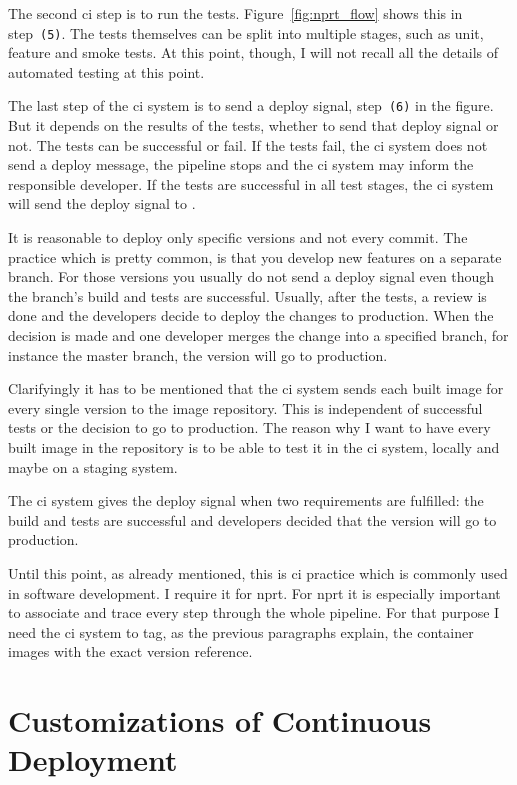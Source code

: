 The second \gls{ci} step is to run the tests. Figure~\ref{fig:nprt_flow} shows this in
step~\texttt{(5)}. The tests themselves can be split into multiple stages, such as unit,
feature and smoke tests. At this point, though, I will not recall all the details of
automated testing at this point.

The last step of the \gls{ci} system is to send a deploy signal, step~\texttt{(6)} in the
figure. But it depends on the results of the tests, whether to send that deploy signal or
not. The tests can be successful or fail. If the tests fail, the \gls{ci} system does not
send a deploy message, the pipeline stops and the \gls{ci} system may inform the
responsible developer. If the tests are successful in all test stages, the \gls{ci} system
will send the deploy signal to \deployer.

It is reasonable to deploy only specific versions and not every commit. The practice which
is pretty common, is that you develop new features on a separate branch. For those
versions you usually do not send a deploy signal even though the branch's build and tests
are successful. Usually, after the tests, a review is done and the developers decide to
deploy the changes to production. When the decision is made and one developer merges the
change into a specified branch, for instance the master branch, the version will go to
production.

Clarifyingly it has to be mentioned that the \gls{ci} system sends each built image for
every single version to the image repository. This is independent of successful tests or
the decision to go to production. The reason why I want to have every built image in the
repository is to be able to test it in the \gls{ci} system, locally and maybe on a staging
system.

The \gls{ci} system gives the deploy signal when two requirements are fulfilled: the build
and tests are successful and developers decided that the version will go to production.

Until this point, as already mentioned, this is \gls{ci} practice which is commonly used
in software development. I require it for \gls{nprt}. For \gls{nprt} it is especially
important to associate and trace every step through the whole pipeline. For that purpose I
need the \gls{ci} system to tag, as the previous paragraphs explain, the container images
with the exact version reference.

\section{Customizations of Continuous Deployment}

